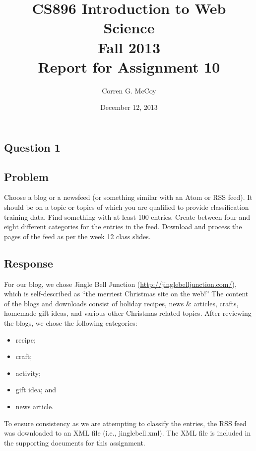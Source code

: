 \documentclass[letterpaper,11pt]{report}
\begin{document}
 
\begin{savenotes}
\pagestyle{plain}
\title{CS896 Introduction to Web Science\\Fall 2013\\Report for Assignment 10}
\author{Corren G. McCoy}
 
\date{December 12, 2013}
\maketitle

\renewcommand*\thesection{\arabic{section}}
\setcounter{section}{0}

\setcounter{tocdepth}{4}
\tableofcontents
 \listoftables
\newpage


\section{Question 1}
\subsection{Problem}Choose a blog or a newsfeed (or something similar with an Atom or RSS feed).  It should be on a topic or topics of which you are  qualified to provide classification training data.  Find something with at least 100 entries. Create between four and eight different categories for the entries in the feed. Download and process the pages of the feed as per the week 12 class slides.

\subsection{Response}For our blog, we chose Jingle Bell Junction (\url{http://jinglebelljunction.com/}), which is self-described as ``the merriest Christmas site on the web!'' The content of the blogs and downloads consist of holiday recipes, news \& articles, crafts, homemade gift ideas, and various other Christmas-related topics. After reviewing the blogs, we chose the following categories:
\begin{itemize}
\item recipe;
\item craft;
\item activity;
\item gift idea; and
\item news article.
\end{itemize}
To ensure consistency as we are attempting to classify the entries, the RSS feed was downloaded to an XML file (i.e., jinglebell.xml). The XML file is included in the supporting documents for this assignment.


\end{savenotes}
\end{document}
